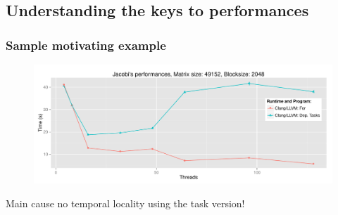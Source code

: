 \documentclass[xcolor={usenames,dvipsnames,svgnames,table}, aspectratio=43]{beamer}
\begin{document}






\subsection{Understanding the keys to performances}

\begin{frame}
\frametitle{Sample motivating example}

\begin{figure}
  \includegraphics[width=\textwidth]{./graph/jacobi_scale_iomp.pdf}
\end{figure}

\begin{alertblock}{Main cause}
  no temporal locality using the task version!
\end{alertblock}
\end{frame}
\end{document}
